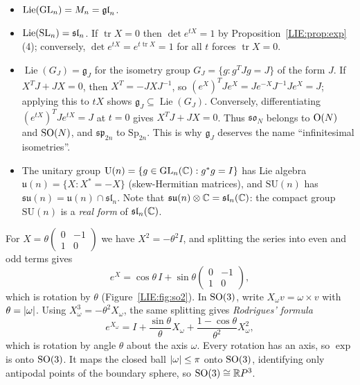 \begin{example}\leavevmode
\begin{itemize}[nosep]
\item $\operatorname{Lie}(\mathrm{GL}_n)=M_n=\mathfrak{gl}_n$.
\item $\operatorname{Lie}(\mathrm{SL}_n)=\mathfrak{sl}_n$. If $\operatorname{tr}X=0$ then $\det e^{tX}=1$ by
  Proposition~\ref{LIE:prop:exp}(4); conversely, $\det e^{tX}=e^{t\operatorname{tr}X}=1$ for all $t$ forces
  $\operatorname{tr}X=0$.
\item $\operatorname{Lie}(G_J)=\mathfrak g_J$ for the isometry group $G_J=\{g: g^TJg=J\}$ of the form $J$. If
  $X^TJ+JX=0$, then $X^T=-JXJ^{-1}$, so $(e^{X})^TJe^{X}=Je^{-X}J^{-1}Je^{X}=J$; applying this to $tX$ shows $\mathfrak g_J\subseteq
  \operatorname{Lie}(G_J)$. Conversely, differentiating $(e^{tX})^TJe^{tX}=J$ at $t=0$ gives $X^TJ+JX=0$. Thus $\mathfrak{so}_N$
  belongs to $\mathrm{O}(N)$ and $\mathrm{SO}(N)$, and $\mathfrak{sp}_{2n}$ to $\mathrm{Sp}_{2n}$. This is why $\mathfrak g_J$
  deserves the name ``infinitesimal isometries''.
\item The unitary group $\mathrm U(n)=\{g\in\mathrm{GL}_n(\mathbb{C}): g^*g=I\}$ has Lie algebra
  $\mathfrak u(n)=\{X: X^*=-X\}$ (skew-Hermitian matrices), and $\mathrm{SU}(n)$ has
  $\mathfrak{su}(n)=\mathfrak u(n)\cap\mathfrak{sl}_n$. Note that $\mathfrak{su}(n)\otimes\mathbb{C}=\mathfrak{sl}_n(\mathbb{C})$: the
  compact group $\mathrm{SU}(n)$ is a \emph{real form} of $\mathfrak{sl}_n(\mathbb{C})$.
\end{itemize}
\end{example}

\begin{example}[$\SO(2)$ and $\SO(3)$]\label{LIE:ex:so3}
For $X=\theta\left(\begin{smallmatrix}0&-1\\1&0\end{smallmatrix}\right)$ we have $X^2=-\theta^2I$, and
splitting the series into even and odd terms gives
\[
  e^X=\cos\theta\,I+\sin\theta\begin{pmatrix}0&-1\\1&0\end{pmatrix},
\]
which is rotation by $\theta$ (Figure~\ref{LIE:fig:so2}). In $\SO(3)$, write $X_\omega v=\omega\times v$
with $\theta=\left\lvert \omega \right\rvert$. Using $X_\omega^3=-\theta^2X_\omega$, the same splitting gives
\emph{Rodrigues' formula}
\[
  e^{X_\omega}=I+\frac{\sin\theta}{\theta}X_\omega+\frac{1-\cos\theta}{\theta^2}X_\omega^2,
\]
which is rotation by angle $\theta$ about the axis $\omega$. Every rotation has an axis, so $\exp$ is
onto $\SO(3)$. It maps the closed ball $\left\lvert \omega \right\rvert\le\pi$ onto $\SO(3)$, identifying only antipodal
points of the boundary sphere, so $\mathrm{SO}(3)\cong\mathbb{R} P^3$.
\end{example}

